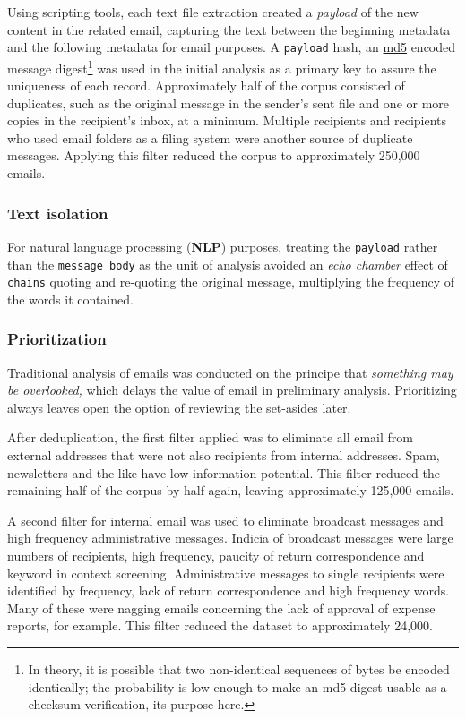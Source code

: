 \documentclass[]{article}
\let\rmarkdownfootnote\footnote%
\def\footnote{\protect\rmarkdownfootnote}
\begin{document}
Using scripting tools, each text file extraction created a
\emph{payload} of the new content in the related email, capturing the
text between the beginning metadata and the following metadata for email
purposes. A \texttt{payload} hash, an
\href{https://en.wikipedia.org/wiki/MD5}{md5} encoded message
digest\footnote{In theory, it is possible that two non-identical
  sequences of bytes be encoded identically; the probability is low
  enough to make an md5 digest usable as a checksum verification, its
  purpose here.} was used in the initial analysis as a primary key to
assure the uniqueness of each record. Approximately half of the corpus
consisted of duplicates, such as the original message in the sender's
sent file and one or more copies in the recipient's inbox, at a minimum.
Multiple recipients and recipients who used email folders as a filing
system were another source of duplicate messages. Applying this filter
reduced the corpus to approximately 250,000 emails.

\hypertarget{text-isolation}{%
\subsubsection{Text isolation}\label{text-isolation}}

For natural language processing (\textbf{NLP}) purposes, treating the
\texttt{payload} rather than the \texttt{message\ body} as the unit of
analysis avoided an \emph{echo chamber} effect of \texttt{chains}
quoting and re-quoting the original message, multiplying the frequency
of the words it contained.

\hypertarget{prioritization}{%
\subsubsection{Prioritization}\label{prioritization}}

Traditional analysis of emails was conducted on the principe that
\emph{something may be overlooked,} which delays the value of email in
preliminary analysis. Prioritizing always leaves open the option of
reviewing the set-asides later.

After deduplication, the first filter applied was to eliminate all email
from external addresses that were not also recipients from internal
addresses. Spam, newsletters and the like have low information
potential. This filter reduced the remaining half of the corpus by half
again, leaving approximately 125,000 emails.

A second filter for internal email was used to eliminate broadcast
messages and high frequency administrative messages. Indicia of
broadcast messages were large numbers of recipients, high frequency,
paucity of return correspondence and keyword in context screening.
Administrative messages to single recipients were identified by
frequency, lack of return correspondence and high frequency words. Many
of these were nagging emails concerning the lack of approval of expense
reports, for example. This filter reduced the dataset to approximately
24,000.
\end{document}
